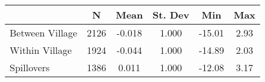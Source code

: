 \begin{tabular}{l*{5}{c}}\hline&\multicolumn{1}{c}{N}&\multicolumn{1}{c}{Mean}&\multicolumn{1}{c}{St. Dev}&\multicolumn{1}{c}{Min}&\multicolumn{1}{c}{Max}\\ \hline 
Between Village & 2126 & -0.018 & 1.000 & -15.01 & 2.93 \\
Within Village & 1924 & -0.044 & 1.000 & -14.89 & 2.03 \\
Spillovers & 1386 & 0.011 & 1.000 & -12.08 & 3.17 \\
\hline \end{tabular}
